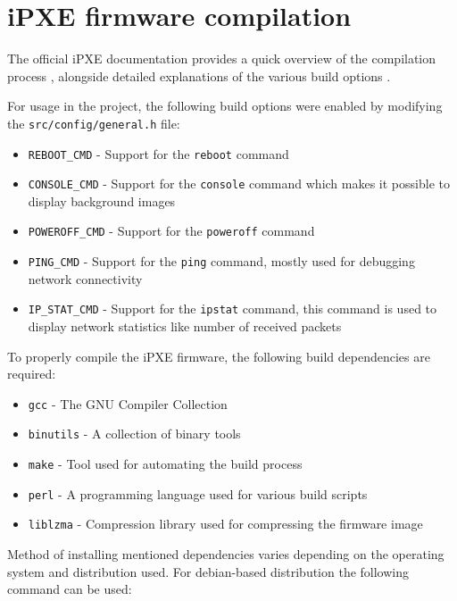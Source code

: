 \documentclass[../main.tex]{subfiles}
\begin{document}
\section{iPXE firmware compilation}

The official iPXE documentation provides a quick overview of the compilation process \cite{ipxe_compilation_guide},
alongside detailed explanations of the various build options \cite{ipxe_build_options}.

For usage in the project, the following build options were enabled by modifying the \texttt{src/config/general.h} file:

\begin{itemize}
  \item \texttt{REBOOT\_CMD}   - Support for the \texttt{reboot} command
  \item \texttt{CONSOLE\_CMD}  - Support for the \texttt{console} command which makes it possible to display background images
  \item \texttt{POWEROFF\_CMD} - Support for the \texttt{poweroff} command
  \item \texttt{PING\_CMD}     - Support for the \texttt{ping} command, mostly used for debugging network connectivity
  \item \texttt{IP\_STAT\_CMD} - Support for the \texttt{ipstat} command, this command is used to display network statistics like number of received packets
\end{itemize}

To properly compile the iPXE firmware, the following build dependencies are required:

\begin{itemize}
  \item \texttt{gcc}      - The GNU Compiler Collection
  \item \texttt{binutils} - A collection of binary tools
  \item \texttt{make}     - Tool used for automating the build process
  \item \texttt{perl}     - A programming language used for various build scripts
  \item \texttt{liblzma}  - Compression library used for compressing the firmware image
\end{itemize}

Method of installing mentioned dependencies varies depending on the operating system and distribution used.
For debian-based distribution the following command can be used:

\begin{code}

\end{code}
\end{document}

